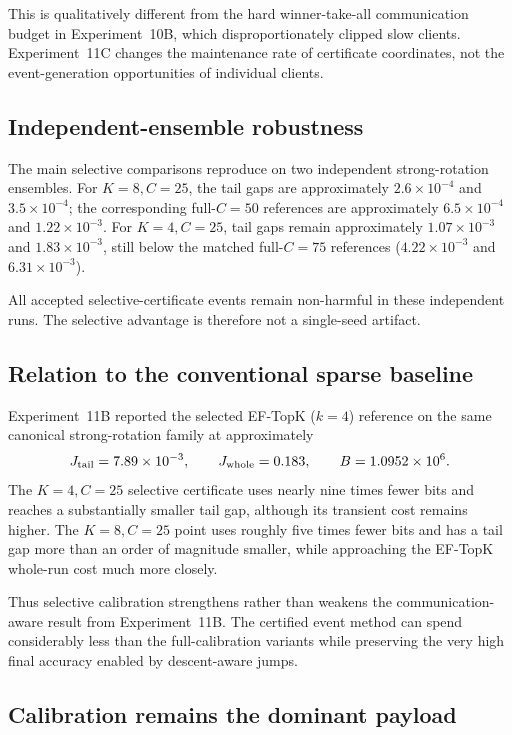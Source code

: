 This is qualitatively different from the hard winner-take-all communication budget in Experiment~10B, which disproportionately clipped slow clients. Experiment~11C changes the maintenance rate of certificate coordinates, not the event-generation opportunities of individual clients.

\subsection{Independent-ensemble robustness}

The main selective comparisons reproduce on two independent strong-rotation ensembles. For $K=8,C=25$, the tail gaps are approximately $2.6\times10^{-4}$ and $3.5\times10^{-4}$; the corresponding full-$C=50$ references are approximately $6.5\times10^{-4}$ and $1.22\times10^{-3}$. For $K=4,C=25$, tail gaps remain approximately $1.07\times10^{-3}$ and $1.83\times10^{-3}$, still below the matched full-$C=75$ references ($4.22\times10^{-3}$ and $6.31\times10^{-3}$).

All accepted selective-certificate events remain non-harmful in these independent runs. The selective advantage is therefore not a single-seed artifact.

\subsection{Relation to the conventional sparse baseline}

Experiment~11B reported the selected EF-TopK ($k=4$) reference on the same canonical strong-rotation family at approximately
\begin{equation}
  J_{\rm tail}=7.89\times10^{-3},
  \qquad
  J_{\rm whole}=0.183,
  \qquad
  B=1.0952\times10^6.
\end{equation}
The $K=4,C=25$ selective certificate uses nearly nine times fewer bits and reaches a substantially smaller tail gap, although its transient cost remains higher. The $K=8,C=25$ point uses roughly five times fewer bits and has a tail gap more than an order of magnitude smaller, while approaching the EF-TopK whole-run cost much more closely.

Thus selective calibration strengthens rather than weakens the communication-aware result from Experiment~11B. The certified event method can spend considerably less than the full-calibration variants while preserving the very high final accuracy enabled by descent-aware jumps.

\subsection{Calibration remains the dominant payload}

